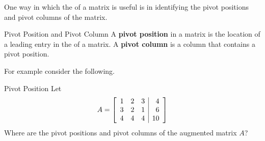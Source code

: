 One way in which the \ef \;of a matrix is useful is in identifying the pivot positions and pivot columns of the matrix.

\begin{definition}{Pivot Position and Pivot Column}\label{def:pivotpositionandcolumn}
A \textbf{pivot position}
in a matrix is the location of a leading entry in the \ef of a matrix.
A \textbf{pivot column}
 is a column that contains a pivot position.
\end{definition}

For example consider the following.

\begin{example}{Pivot Position}\label{exa:pivotposition}
Let
\begin{equation*}
A=\left[
\begin{array}{rrr|r}
1 & 2 & 3 & 4 \\
3 & 2 & 1 & 6 \\
4 & 4 & 4 & 10
\end{array}
\right]
\end{equation*}
Where are the pivot positions
and pivot columns of the augmented matrix $A$?
\end{example}

